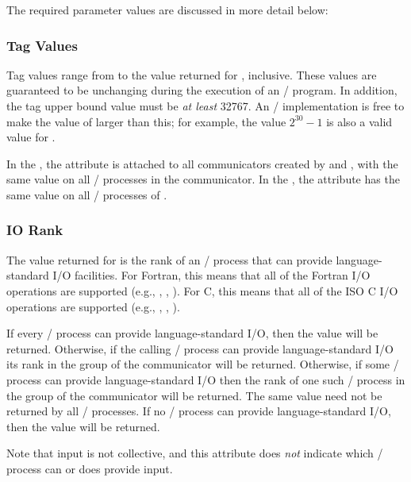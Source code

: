 The required parameter values are discussed in more detail below:

\subsubsection{Tag Values}
Tag values range from  to the value returned for ,
inclusive.
These values are guaranteed to be unchanging during the execution of an \MPI/
program.
In addition, the tag upper bound value must be \emph{at least} 32767.
An \MPI/ implementation is free to make the value of  larger
than this;
for example, the value \(2^{30}-1\) is also a valid value for
.

In the \spm{}, the attribute  is attached to
all communicators created by  and\flushline
{},
with the same value on all \MPI/ processes in the communicator.
In the \wpm{},
the attribute  has the same value on all \mpi/ processes
of .


\subsubsection{IO Rank}
The value returned for  is the rank of an \mpi/ process that can
provide language-standard I/O facilities.  For Fortran, this means that all of
the Fortran I/O operations are supported (e.g., , ,
).  For C, 
this means that all of the 
ISO C
I/O operations are
supported (e.g., , , ).

If every \mpi/ process can provide language-standard I/O, then the value
 will be returned.  Otherwise, if the calling
\mpi/ process can provide language-standard I/O its rank in the group of the communicator will be
returned.  Otherwise, if some \mpi/ process can provide language-standard
I/O then the rank of one such \mpi/ process in the group of the communicator will be returned. The same value
need not be returned by all \mpi/ processes.
If no \mpi/ process can provide
language-standard I/O, then the value
 will be  %
returned.

\begin{users}
Note that input is not collective, and this attribute does \emph{not} indicate
which \mpi/ process can or does provide input.
\end{users}

